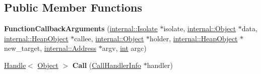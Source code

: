 \subsection*{Public Member Functions}
\begin{DoxyCompactItemize}
\item 
\mbox{\label{classv8_1_1internal_1_1FunctionCallbackArguments_ad59ccdea5229c8530d7e210005265a8e}} 
{\bfseries Function\+Callback\+Arguments} (\mbox{\hyperlink{classv8_1_1internal_1_1Isolate}{internal\+::\+Isolate}} $\ast$isolate, \mbox{\hyperlink{classv8_1_1internal_1_1Object}{internal\+::\+Object}} $\ast$data, \mbox{\hyperlink{classv8_1_1internal_1_1HeapObject}{internal\+::\+Heap\+Object}} $\ast$callee, \mbox{\hyperlink{classv8_1_1internal_1_1Object}{internal\+::\+Object}} $\ast$holder, \mbox{\hyperlink{classv8_1_1internal_1_1HeapObject}{internal\+::\+Heap\+Object}} $\ast$new\+\_\+target, \mbox{\hyperlink{classuintptr__t}{internal\+::\+Address}} $\ast$argv, \mbox{\hyperlink{classint}{int}} argc)
\item 
\mbox{\label{classv8_1_1internal_1_1FunctionCallbackArguments_a8e272debe68742253e1c778a09c45ac4}} 
\mbox{\hyperlink{classv8_1_1internal_1_1Handle}{Handle}}$<$ \mbox{\hyperlink{classv8_1_1internal_1_1Object}{Object}} $>$ {\bfseries Call} (\mbox{\hyperlink{classv8_1_1internal_1_1CallHandlerInfo}{Call\+Handler\+Info}} $\ast$handler)
\end{DoxyCompactItemize}
